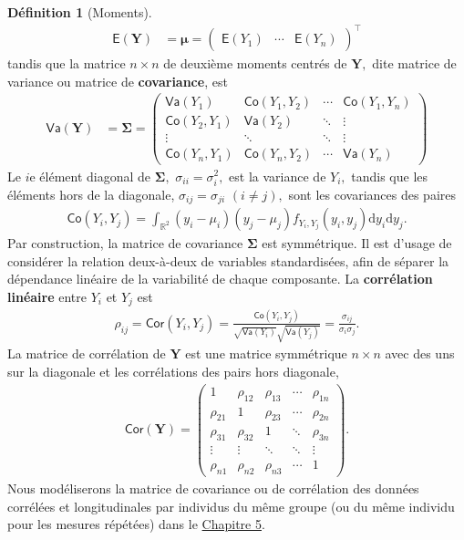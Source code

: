 \documentclass[
  11pt,
  letterpaper,
]{scrbook}
\theoremstyle{plain}
\theoremstyle{plain}
\theoremstyle{definition}
\theoremstyle{definition}
\newtheorem{definition}{Définition}[chapter]
\theoremstyle{remark}
\begin{document}
\begin{definition}[Moments]
\begin{align*}
\mathsf{E}(\boldsymbol{Y}) &= \boldsymbol{\mu}=
\begin{pmatrix}
\mathsf{E}(Y_1) &
\cdots  &
\mathsf{E}(Y_n)
\end{pmatrix}^\top
\end{align*} tandis que la matrice \(n \times n\) de deuxième moments
centrés de \(\boldsymbol{Y},\) dite matrice de variance ou matrice de
\textbf{covariance}, est \begin{align*}
\mathsf{Va}(\boldsymbol{Y}) &= \boldsymbol{\Sigma} = \begin{pmatrix} \mathsf{Va}(Y_1) & \mathsf{Co}(Y_1, Y_2)  & \cdots & \mathsf{Co}(Y_1, Y_n) \\
\mathsf{Co}(Y_2, Y_1) & \mathsf{Va}(Y_2) & \ddots & \vdots \\
\vdots & \ddots & \ddots & \vdots \\
\mathsf{Co}(Y_n, Y_1) & \mathsf{Co}(Y_n, Y_2) &\cdots & \mathsf{Va}(Y_n)
\end{pmatrix}
\end{align*} Le \(i\)e élément diagonal de \(\boldsymbol{\Sigma},\)
\(\sigma_{ii}=\sigma_i^2,\) est la variance de \(Y_i,\) tandis que les
éléments hors de la diagonale, \(\sigma_{ij}=\sigma_{ji}\)
\((i \neq j),\) sont les covariances des paires \begin{align*}
\mathsf{Co}(Y_i, Y_j) = \int_{\mathbb{R}^2} (y_i-\mu_i)(y_j-\mu_j) f_{Y_i, Y_j}(y_i, y_j) \mathrm{d} y_i \mathrm{d} y_j.
\end{align*} Par construction, la matrice de covariance
\(\boldsymbol{\Sigma}\) est symmétrique. Il est d'usage de considérer la
relation deux-à-deux de variables standardisées, afin de séparer la
dépendance linéaire de la variabilité de chaque composante. La
\textbf{corrélation linéaire} entre \(Y_i\) et \(Y_j\) est
\begin{align*}
\rho_{ij}=\mathsf{Cor}(Y_i,Y_j)=\frac{\mathsf{Co}(Y_i, Y_j)}{\sqrt{\mathsf{Va}(Y_i)}\sqrt{\mathsf{Va}(Y_j)}}=\frac{\sigma_{ij}}{\sigma_i\sigma_j}.
\end{align*} La matrice de corrélation de \(\boldsymbol{Y}\) est une
matrice symmétrique \(n\times n\) avec des uns sur la diagonale et les
corrélations des pairs hors diagonale, \begin{align*}
\mathsf{Cor}(\boldsymbol{Y})=
\begin{pmatrix}
1 & \rho_{12} & \rho_{13} & \cdots & \rho_{1n}\\
\rho_{21} & 1 & \rho_{23} & \cdots & \rho_{2n} \\
\rho_{31} & \rho_{32} & 1 & \ddots & \rho_{3n} \\
\vdots & \vdots & \ddots & \ddots & \vdots \\
\rho_{n1} & \rho_{n2} & \rho_{n3} & \cdots & 1
\end{pmatrix}.
\end{align*} Nous modéliserons la matrice de covariance ou de
corrélation des données corrélées et longitudinales par individus du
même groupe (ou du même individu pour les mesures répétées) dans le
\href{donnees-longitudinales-correlees}{Chapitre 5}.

\end{definition}
\end{document}
